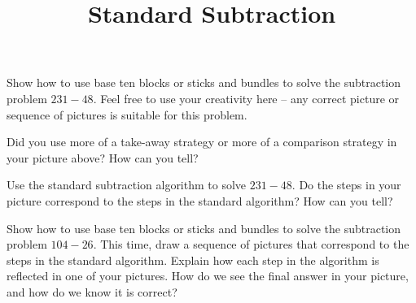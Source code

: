 \documentclass[nooutcomes,noauthor]{ximera}
\title{Standard Subtraction}
\begin{document}
\begin{abstract}
\end{abstract}

\maketitle

\begin{problem}
Show how to use base ten blocks or sticks and bundles to solve the subtraction problem $231 - 48$. Feel free to use your creativity here -- any correct picture or sequence of pictures is suitable for this problem.
\end{problem}


\begin{problem}
Did you use more of a take-away strategy or more of a comparison strategy in your picture above? How can you tell?
\end{problem}


\begin{problem}
Use the standard subtraction algorithm to solve $231 - 48$. Do the steps in your picture correspond to the steps in the standard algorithm? How can you tell?
\end{problem}


\begin{problem}
Show how to use base ten blocks or sticks and bundles to solve the subtraction problem $104 - 26$. This time, draw a sequence of pictures that correspond to the steps in the standard algorithm. Explain how each step in the algorithm is reflected in one of your pictures. How do we see the final answer in your picture, and how do we know it is correct?
\end{problem}



\newpage
\end{document}
